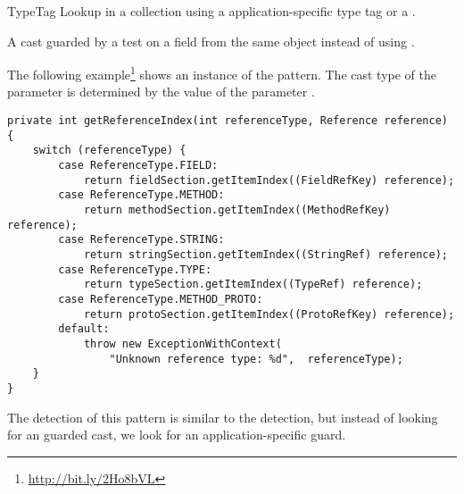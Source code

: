 \begin{pattern}{TypeTag}
Lookup in a collection using a application-specific type tag or a
.

A cast guarded by a test on a field from the same object instead of
using .

\instances{}
The following example\footnote{\url{http://bit.ly/2Ho8bVL}} shows an instance of the \thisp{} pattern.
The cast type of the parameter  is determined by the value of the parameter .

\begin{verbatim}
private int getReferenceIndex(int referenceType, Reference reference) {
    switch (referenceType) {
        case ReferenceType.FIELD:
            return fieldSection.getItemIndex((FieldRefKey) reference);
        case ReferenceType.METHOD:
            return methodSection.getItemIndex((MethodRefKey) reference);
        case ReferenceType.STRING:
            return stringSection.getItemIndex((StringRef) reference);
        case ReferenceType.TYPE:
            return typeSection.getItemIndex((TypeRef) reference);
        case ReferenceType.METHOD_PROTO:
            return protoSection.getItemIndex((ProtoRefKey) reference);
        default:
            throw new ExceptionWithContext(
                "Unknown reference type: %d",  referenceType);
    }
}
\end{verbatim}

\detection{}
The detection of this pattern is similar to the  detection, but instead of looking for an  guarded cast, we look for an application-specific guard.

\discussion{}

\related{}

\end{pattern}